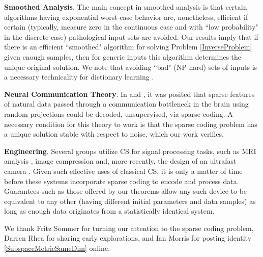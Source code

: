 \documentclass[journal, twocolumn]{IEEEtran}
\begin{document}
\textbf{Smoothed Analysis}.
The main concept in smoothed analysis \cite{Spielman04} is that certain algorithms having exponential worst-case behavior are, nonetheless, efficient if certain (typically, measure zero in the continuous case and with ``low probability" in the discrete case) pathological input sets are avoided. Our results imply that if there is an efficient ``smoothed" algorithm for solving Problem \ref{InverseProblem} given enough samples, then for generic inputs this algorithm determines the unique original solution. We note that avoiding ``bad" (NP-hard) sets of inputs is a necessary technicality for dictionary learning \cite{Razaviyayn15, Tillmann15}.

\textbf{Neural Communication Theory}.
In \cite{Coulter10} and \cite{Isely10}, it was posited that sparse features of natural data passed through a communication bottleneck in the brain using random projections could be decoded, unsupervised, via sparse coding.  A necessary condition for this theory to work is that the sparse coding problem has a unique solution stable with respect to noise, which our work verifies. 

\textbf{Engineering}.
Several groups utilize CS for signal processing tasks, such as MRI analysis \cite{lustig2008compressed},  image compression \cite{Duarte08}  and, more recently, the design of an ultrafast camera \cite{Gao14}. Given such effective uses of classical CS, it is only a matter of time before these systems incorporate sparse coding to encode and process data. Guarantees such as those offered by our theorems allow any such device to be equivalent to any other (having different initial parameters and data samples) as long as enough data originates from a statistically identical system.


We thank Fritz Sommer for turning our attention to the sparse coding problem, Darren Rhea for sharing early explorations, and Ian Morris for posting identity \eqref{SubspaceMetricSameDim} online.  
\end{document}
